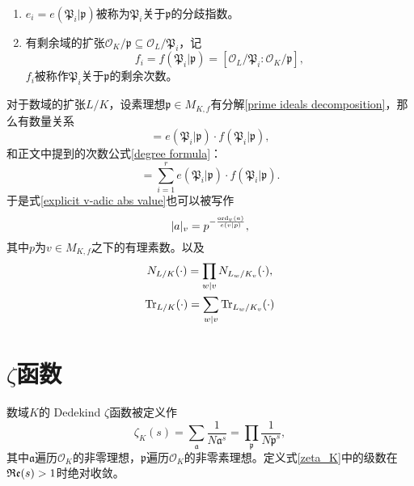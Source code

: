 \begin{definition}\
\begin{enumerate}
\item $e_i = e(\mathfrak{P}_i|\mathfrak{p})$被称为$\mathfrak{P}_i$关于$\mathfrak{p}$的分歧指数。
\item 有剩余域的扩张$\mathcal{O}_K/\mathfrak{p} \subseteq \mathcal{O}_L/\mathfrak{P}_i$，记
\begin{equation}
f_i = f(\mathfrak{P}_i|\mathfrak{p}) = [\mathcal{O}_L/\mathfrak{P}_i: \mathcal{O}_K/\mathfrak{p}],
\end{equation}
$f_i$被称作$\mathfrak{P}_i$关于$\mathfrak{p}$的剩余次数。
\end{enumerate}
\end{definition}

对于数域的扩张$L/K$，设素理想$\mathfrak{p}\in M_{K,f}$有分解\eqref{prime ideals decomposition}，那么有数量关系
\begin{equation}
[L_{\mathfrak{P}_i} : K_{\mathfrak{p}}] = e(\mathfrak{P}_i|\mathfrak{p})\cdot f(\mathfrak{P}_i|\mathfrak{p}),
\end{equation}
和正文中提到的次数公式\eqref{degree formula}：
\begin{equation}
[L: K] = \sum\limits_{i=1}^r e(\mathfrak{P}_i|\mathfrak{p}) \cdot f(\mathfrak{P}_i|\mathfrak{p}).
\end {equation}
于是式\eqref{explicit v-adic abs value}也可以被写作
\begin{equation}
|a|_v = p^{-\frac{\operatorname{ord}_v(a)}{e(v|p)}},
\end{equation}
其中$p$为$v\in M_{K,f}$之下的有理素数。以及
\begin{gather}
N_{L/K}(\cdot) = \prod\limits_{w|v} N_{L_w/K_v}(\cdot), \\
\operatorname{Tr}_{L/K}(\cdot) = \sum\limits_{w|v} \operatorname{Tr}_{L_w/K_v}(\cdot)
\end{gather}

\section{$\zeta$函数}
\label{apdx: zeta function}
\begin{definition}
数域$K$的 Dedekind $\zeta$函数被定义作
\begin{equation} \label{zeta_K}
\zeta_K(s) = \sum\limits_{\mathfrak{a}} \dfrac{1}{N\mathfrak{a}^s} = \prod\limits_{\mathfrak{p}} \dfrac{1}{N\mathfrak{p}^s},
\end{equation}
其中$\mathfrak{a}$遍历$\mathcal{O}_K$的非零理想，$\mathfrak{p}$遍历$\mathcal{O}_K$的非零素理想。定义式\eqref{zeta_K}中的级数在$\operatorname{\mathfrak{Re}}(s) > 1$时绝对收敛。
\end{definition}

